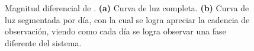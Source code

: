\begin{figure}[!ht]
	\centering
	\caption{Magnitud diferencial de \atoObjIdNoSpace. \textbf{(a)} Curva de luz
	completa. \textbf{(b)} Curva de luz segmentada por día, con la cual se logra
	apreciar la cadencia de observación, viendo como cada día se logra observar
	una fase diferente del sistema.}
	\label{figuraIturbideAtoLightCurve}
\end{figure}